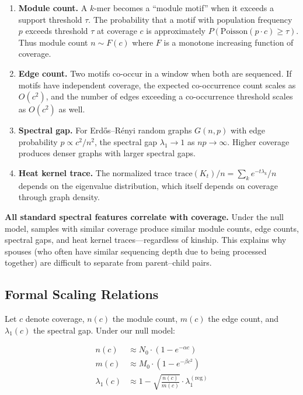 \documentclass{../yalumba}
\begin{document}
\begin{enumerate}
  \item \textbf{Module count.}  A $k$-mer becomes a ``module motif'' when
    it exceeds a support threshold $\tau$.  The probability that a
    motif with population frequency $p$ exceeds threshold $\tau$ at
    coverage $c$ is approximately $P(\mathrm{Poisson}(p \cdot c) \geq
    \tau)$.  Thus module count $n \sim F(c)$ where $F$ is a monotone
    increasing function of coverage.

  \item \textbf{Edge count.}  Two motifs co-occur in a window when both
    are sequenced.  If motifs have independent coverage, the expected
    co-occurrence count scales as $O(c^2)$, and the number of edges
    exceeding a co-occurrence threshold scales as $O(c^2)$ as well.

  \item \textbf{Spectral gap.}  For Erd\H{o}s--R\'enyi random graphs
    $G(n, p)$ with edge probability $p \propto c^2/n^2$, the spectral gap
    $\lambda_1 \to 1$ as $np \to \infty$.  Higher coverage produces
    denser graphs with larger spectral gaps.

  \item \textbf{Heat kernel trace.}  The normalized trace
    $\mathrm{trace}(K_t) / n = \sum_k e^{-t\lambda_k} / n$ depends on
    the eigenvalue distribution, which itself depends on coverage through
    graph density.
\end{enumerate}

\begin{keyfinding}
\textbf{All standard spectral features correlate with coverage.}  Under
the null model, samples with similar coverage produce similar module
counts, edge counts, spectral gaps, and heat kernel traces---regardless
of kinship.  This explains why spouses (who often have similar
sequencing depth due to being processed together) are difficult to
separate from parent--child pairs.
\end{keyfinding}

\subsection{Formal Scaling Relations}
\label{sec:coverage:scaling}

Let $c$ denote coverage, $n(c)$ the module count, $m(c)$ the edge
count, and $\lambda_1(c)$ the spectral gap.  Under our null model:

\begin{align}
  n(c) &\approx N_0 \cdot \left(1 - e^{-\alpha c}\right)
  \label{eq:module_scaling} \\
  m(c) &\approx M_0 \cdot \left(1 - e^{-\beta c^2}\right)
  \label{eq:edge_scaling} \\
  \lambda_1(c) &\approx 1 - \sqrt{\frac{n(c)}{m(c)}} \cdot
  \lambda_1^{(\mathrm{reg})}
  \label{eq:gap_scaling}
\end{align}
\end{document}
